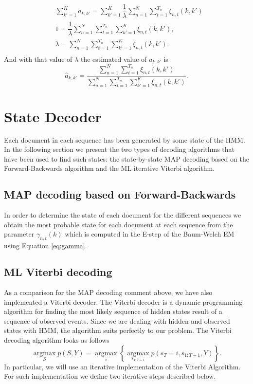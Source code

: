 \documentclass[12pt]{article}
\begin{document}
\begin{equation}
\begin{split}
& \sum \limits_{k'=1}^{K}a_{k,k'} = \sum \limits_{k'=1}^{K} \dfrac{1}{\lambda} \sum \limits_{n=1}^{N}\sum _ { t = 1 } ^ { T _ { n } } \xi_{n,t}(k,k')\\
& 1 = \dfrac{1}{\lambda} \sum \limits_{n=1}^{N}\sum _ { t = 1 } ^ { T _ { n } }\sum \limits_{k'=1}^{K}\xi_{n,t}(k,k'),\\
& \lambda = \sum \limits_{n=1}^{N}\sum \limits_{ t = 1 } ^ { T _ { n }}\sum \limits_{k'=1}^{K}\xi_{n,t}(k,k').\\
\end{split}
\end{equation}
And with that value of $\lambda$ the estimated value of $a_{k,k'}$ is
\begin{equation}
\widehat{a}_{k,k'} = \dfrac{\sum \limits_{n=1}^{N} \sum \limits_ { t = 1 } ^ { T _ { n } }\xi_{n,t}(k,k')}{\sum \limits_{n=1}^{N}\sum \limits_ { t = 1 } ^ { T _ { n } }\sum \limits_{k'=1}^{K}\xi_{n,t}(k,k')}.
\end{equation}

\section{State Decoder}
Each document in each sequence has been generated by some state of the HMM. In the following section we present the two types of decoding algorithms that have been used to find such states: the state-by-state MAP decoding based on the Forward-Backwards algorithm and the ML iterative Viterbi algorithm.

\subsection{MAP decoding based on Forward-Backwards}
In order to determine the state of each document for the different sequences we obtain the most probable state for each document at each sequence from the parameter $\gamma _ { n , t } ( k )$ which is computed in the E-step of the Baum-Welch EM using Equation \ref{eq:gamma}.

\subsection{ML Viterbi decoding}
As a comparison for the MAP decoding comment above, we have also implemented a Viterbi decoder. The Viterbi decoder is a dynamic programming algorithm for finding the most likely sequence of hidden states result of a sequence of observed events. Since we are dealing with hidden and observed states with HMM, the algorithm suits perfectly to our problem. The Viterbi decoding algorithm looks as follows
\begin{equation}
\underset { S } { \operatorname { argmax } } p ( S , Y ) = \underset { i } { \operatorname { argmax } } \left\{ \underset { s _ { 1 : T - 1 } } { \operatorname { argmax } } p \left( s _ { T } = i , s _ { 1 : T - 1 } , Y \right) \right\}.
\end{equation}
In particular, we will use an iterative implementation of the Viterbi Algorithm. For such implementation we define two iterative steps described below.
\end{document}
